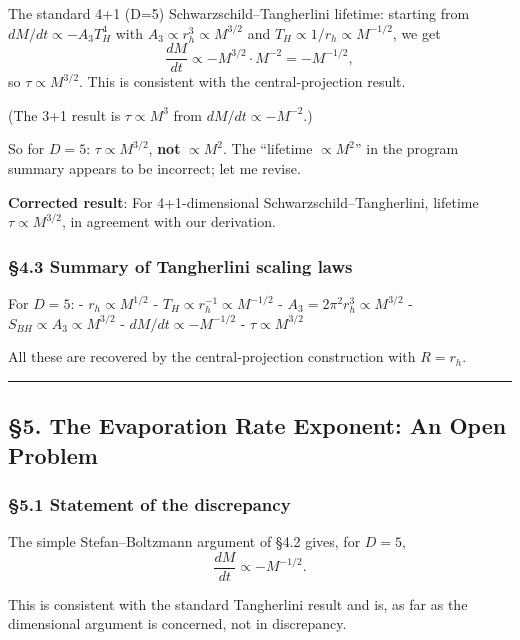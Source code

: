 \documentclass[a4paper,11pt]{article}
\theoremstyle{definition}
\begin{document}
The standard 4+1 (D=5) Schwarzschild--Tangherlini lifetime: starting
from \(dM/dt \propto -A_3 T_H^4\) with
\(A_3 \propto r_h^3 \propto M^{3/2}\) and
\(T_H \propto 1/r_h \propto M^{-1/2}\), we get
\[\frac{dM}{dt} \propto -M^{3/2} \cdot M^{-2} = -M^{-1/2},\] so
\(\tau \propto M^{3/2}\). This is consistent with the central-projection
result.

(The 3+1 result is \(\tau \propto M^3\) from \(dM/dt \propto -M^{-2}\).)

So for \(D = 5\): \(\tau \propto M^{3/2}\), \textbf{not}
\(\propto M^2\). The ``lifetime \(\propto M^2\)'' in the program summary
appears to be incorrect; let me revise.

\textbf{Corrected result}: For 4+1-dimensional
Schwarzschild--Tangherlini, lifetime \(\tau \propto M^{3/2}\), in
agreement with our derivation.

\subsubsection{§4.3 Summary of Tangherlini scaling
laws}\label{summary-of-tangherlini-scaling-laws}

For \(D = 5\): - \(r_h \propto M^{1/2}\) -
\(T_H \propto r_h^{-1} \propto M^{-1/2}\) -
\(A_3 = 2\pi^2 r_h^3 \propto M^{3/2}\) -
\(S_{BH} \propto A_3 \propto M^{3/2}\) - \(dM/dt \propto -M^{-1/2}\) -
\(\tau \propto M^{3/2}\)

All these are recovered by the central-projection construction with
\(R = r_h\).

\begin{center}\rule{0.5\linewidth}{0.5pt}\end{center}

\subsection{§5. The Evaporation Rate Exponent: An Open
Problem}\label{the-evaporation-rate-exponent-an-open-problem}

\subsubsection{§5.1 Statement of the
discrepancy}\label{statement-of-the-discrepancy}

The simple Stefan--Boltzmann argument of §4.2 gives, for \(D = 5\),
\[\frac{dM}{dt} \propto -M^{-1/2}.\]

This is consistent with the standard Tangherlini result and is, as far
as the dimensional argument is concerned, not in discrepancy.
\end{document}
